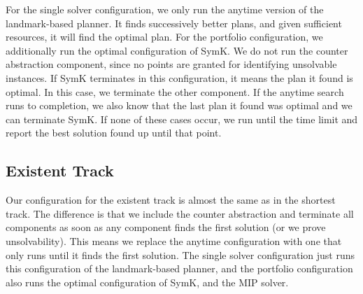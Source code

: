 \documentclass{article}
\renewcommand{\todo}[1]{} %
\begin{document}
For the single solver configuration, we only run the anytime version of the landmark-based planner. It finds successively better plans, and given sufficient resources, it will find the optimal plan. For the portfolio configuration, we additionally run the optimal configuration of SymK. We do not run the counter abstraction component, since no points are granted for identifying unsolvable instances. If SymK terminates in this configuration, it means the plan it found is optimal. In this case, we terminate the other component. If the anytime search runs to completion, we also know that the last plan it found was optimal and we can terminate SymK. If none of these cases occur, we run until the time limit and report the best solution found up until that point.

\todo{\begin{itemize}
    \item For the single solver configuration, we only run the anytime version of the landmark-based planner. It finds successively better plans, and given sufficient resources, it will find the optimal plan.
    \item For the portfolio configuration, we additionally run the optimal configuration of SymK, and the counter abstraction component.
    \item If the counter abstractions show that the instance is unsolvable, we terminate the other components.
    \item If SymK terminates in this configuration, it means the plan it found is optimal. in this case, we also terminate the other components.
    \item If the anytime search runs to completion, we also know that the last plan it found was optimal and we can terminate the other components.
    \item If none of these cases occur, we run until the time limit and report the best solution found until then.
\end{itemize}}


\subsection{Existent Track}

Our configuration for the existent track is almost the same as in the shortest track. The difference is that we include the counter abstraction and terminate all components as soon as any component finds the first solution (or we prove unsolvability). This means we replace the anytime configuration with one that only runs until it finds the first solution. The single solver configuration just runs this configuration of the landmark-based planner, and the portfolio configuration also runs the optimal configuration of SymK, and the MIP solver.
\end{document}
